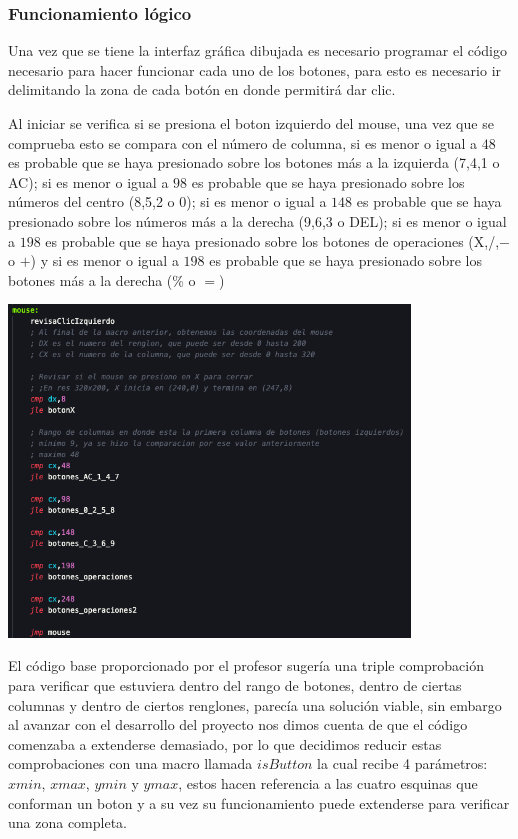 \documentclass[letterpaper,12 pt,titlepage]{article}
\begin{document}
    \subsubsection{Funcionamiento lógico}

    Una vez que se tiene la interfaz gráfica dibujada es necesario programar el código necesario para hacer funcionar cada uno de los botones, para esto es necesario ir delimitando la zona de cada botón en donde permitirá dar clic.

    Al iniciar se verifica si se presiona el boton izquierdo del mouse, una vez que se comprueba esto se compara con el número de columna, si es menor o igual a $48$ es probable que se haya presionado sobre los botones más a la izquierda (7,4,1 o AC); si es menor o igual a $98$ es probable que se haya presionado sobre los números del centro (8,5,2 o 0); si es menor o igual a $148$ es probable que se haya presionado sobre los números más a la derecha (9,6,3 o DEL); si es menor o igual a $198$ es probable que se haya presionado sobre los botones de operaciones (X,/,$-$ o $+$) y si es menor o igual a $198$ es probable que se haya presionado sobre los botones más a la derecha (\% o $=$)

    \begin{center}
        \includegraphics[width=0.8\textwidth]{img/18.png}
    \end{center}


    El código base proporcionado por el profesor sugería una triple comprobación para verificar que estuviera dentro del rango de botones, dentro de ciertas columnas y dentro de ciertos renglones, parecía una solución viable, sin embargo al avanzar con el desarrollo del proyecto nos dimos cuenta de que el código comenzaba a extenderse demasiado, por lo que decidimos reducir estas comprobaciones con una macro llamada $isButton$ la cual recibe 4 parámetros:
    $xmin$, $xmax$, $ymin$ y $ymax$, estos hacen referencia a las cuatro esquinas que conforman un boton y a su vez su funcionamiento puede extenderse para verificar una zona completa.
\end{document}
